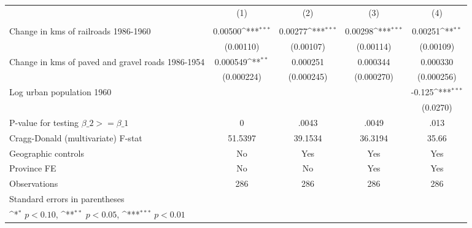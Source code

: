 {
\def\sym#1{\ifmmode^{#1}\else\(^{#1}\)\fi}
\begin{tabular}{l*{4}{c}}
\hline\hline
                &\multicolumn{1}{c}{(1)}&\multicolumn{1}{c}{(2)}&\multicolumn{1}{c}{(3)}&\multicolumn{1}{c}{(4)}\\
                &\multicolumn{1}{c}{}&\multicolumn{1}{c}{}&\multicolumn{1}{c}{}&\multicolumn{1}{c}{}\\
\hline
Change in kms of railroads 1986-1960&  0.00500\sym{***}&  0.00277\sym{***}&  0.00298\sym{***}&  0.00251\sym{**} \\
                &(0.00110)         &(0.00107)         &(0.00114)         &(0.00109)         \\
[1em]
Change in kms of paved and gravel roads 1986-1954& 0.000549\sym{**} & 0.000251         & 0.000344         & 0.000330         \\
                &(0.000224)         &(0.000245)         &(0.000270)         &(0.000256)         \\
[1em]
Log urban population 1960&                  &                  &                  &   -0.125\sym{***}\\
                &                  &                  &                  & (0.0270)         \\
\hline
P-value for testing $\beta\_{2} >= \beta\_{1}$&        0         &    .0043         &    .0049         &     .013         \\
Cragg-Donald (multivariate) F-stat&  51.5397         &  39.1534         &  36.3194         &35.66         \\
Geographic controls&       No         &      Yes         &      Yes         &      Yes         \\
Province FE     &       No         &       No         &      Yes         &      Yes         \\
Observations    &      286         &      286         &      286         &      286         \\
\hline\hline
\multicolumn{5}{l}{\footnotesize Standard errors in parentheses}\\
\multicolumn{5}{l}{\footnotesize \sym{*} \(p<0.10\), \sym{**} \(p<0.05\), \sym{***} \(p<0.01\)}\\
\end{tabular}
}
